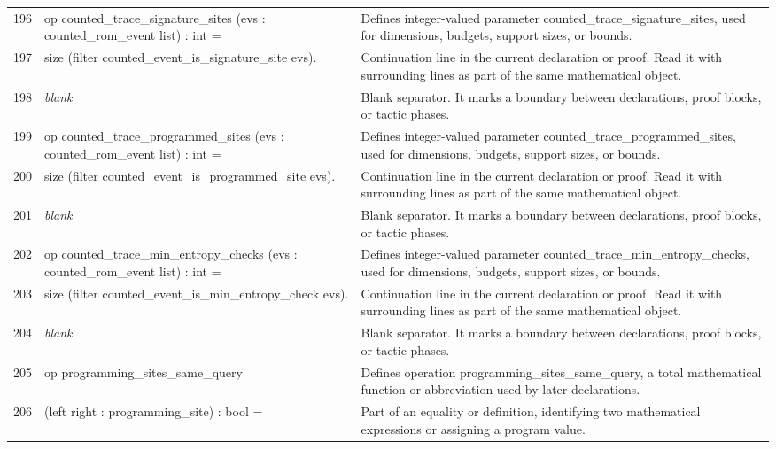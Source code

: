 \documentclass[10pt]{article}
\begin{document}
\begin{longtable}{r L{0.53\textwidth} L{0.37\textwidth}}
196 & {\ttfamily\scriptsize op counted\_trace\_signature\_sites (evs : counted\_rom\_event list) : int =} & Defines integer-valued parameter counted\_trace\_signature\_sites, used for dimensions, budgets, support sizes, or bounds. \\
197 & {\ttfamily\scriptsize   size (filter counted\_event\_is\_signature\_site evs).} & Continuation line in the current declaration or proof.  Read it with surrounding lines as part of the same mathematical object. \\
198 & {\ttfamily\scriptsize \emph{blank}} & Blank separator.  It marks a boundary between declarations, proof blocks, or tactic phases. \\
199 & {\ttfamily\scriptsize op counted\_trace\_programmed\_sites (evs : counted\_rom\_event list) : int =} & Defines integer-valued parameter counted\_trace\_programmed\_sites, used for dimensions, budgets, support sizes, or bounds. \\
200 & {\ttfamily\scriptsize   size (filter counted\_event\_is\_programmed\_site evs).} & Continuation line in the current declaration or proof.  Read it with surrounding lines as part of the same mathematical object. \\
201 & {\ttfamily\scriptsize \emph{blank}} & Blank separator.  It marks a boundary between declarations, proof blocks, or tactic phases. \\
202 & {\ttfamily\scriptsize op counted\_trace\_min\_entropy\_checks (evs : counted\_rom\_event list) : int =} & Defines integer-valued parameter counted\_trace\_min\_entropy\_checks, used for dimensions, budgets, support sizes, or bounds. \\
203 & {\ttfamily\scriptsize   size (filter counted\_event\_is\_min\_entropy\_check evs).} & Continuation line in the current declaration or proof.  Read it with surrounding lines as part of the same mathematical object. \\
204 & {\ttfamily\scriptsize \emph{blank}} & Blank separator.  It marks a boundary between declarations, proof blocks, or tactic phases. \\
205 & {\ttfamily\scriptsize op programming\_sites\_same\_query} & Defines operation programming\_sites\_same\_query, a total mathematical function or abbreviation used by later declarations. \\
206 & {\ttfamily\scriptsize    (left right : programming\_site) : bool =} & Part of an equality or definition, identifying two mathematical expressions or assigning a program value. \\

\end{longtable}
\end{document}
